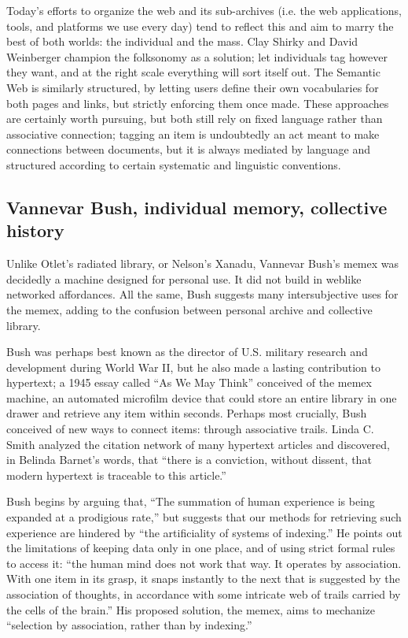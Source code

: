Today's efforts to organize the web and its sub-archives (i.e. the web applications, tools, and platforms we use every day) tend to reflect this and aim to marry the best of both worlds: the individual and the mass. Clay Shirky and David Weinberger champion the folksonomy as a solution; let individuals tag however they want, and at the right scale everything will sort itself out.\autocite[165-8]{shirky_ontology_2005,weinberger_everything_2008} The Semantic Web is similarly structured, by letting users define their own vocabularies for both pages and links, but strictly enforcing them once made.  These approaches are certainly worth pursuing, but both still rely on fixed language rather than associative connection; tagging an item is undoubtedly an act meant to make connections between documents, but it is always mediated by language and structured according to certain systematic and linguistic conventions.

\subsection{Vannevar Bush, individual memory, collective history}

Unlike Otlet's radiated library, or Nelson's Xanadu, Vannevar Bush's memex was decidedly a machine designed for personal use. It did not build in weblike networked affordances. All the same, Bush suggests many intersubjective uses for the memex, adding to the confusion between personal archive and collective library.

Bush was perhaps best known as the director of U.S. military research and development during World War II, but he also made a lasting contribution to hypertext; a 1945 essay called ``As We May Think'' conceived of the memex machine, an automated microfilm device that could store an entire library in one drawer and retrieve any item within seconds.\autocite{bush_as_1945} Perhaps most crucially, Bush conceived of new ways to connect items: through associative trails. Linda C. Smith analyzed the citation network of many hypertext articles and discovered, in Belinda Barnet's words, that ``there is a conviction, without dissent, that modern hypertext is traceable to this article.''\autocite{barnet_technical_2008}

Bush begins by arguing that, ``The summation of human experience is being expanded at a prodigious rate,'' but suggests that our methods for retrieving such experience are hindered by ``the artificiality of systems of indexing.''\autocite{bush_as_1945} He points out the limitations of keeping data only in one place, and of using strict formal rules to access it: ``the human mind does not work that way. It operates by association. With one item in its grasp, it snaps instantly to the next that is suggested by the association of thoughts, in accordance with some intricate web of trails carried by the cells of the brain.'' His proposed solution, the memex, aims to mechanize ``selection by association, rather than by indexing.''\autocite{bush_as_1945}

